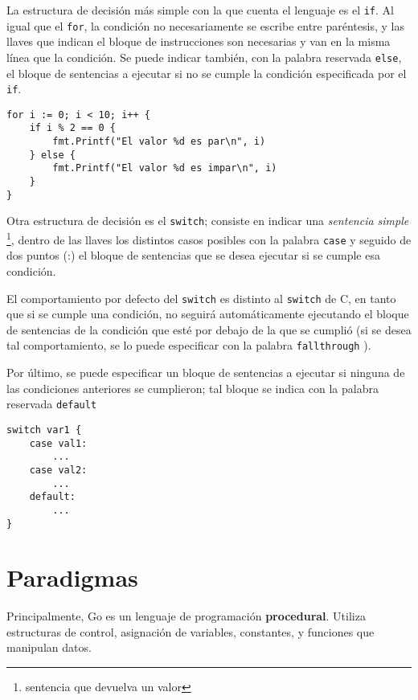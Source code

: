 La estructura de decisión más simple con la que cuenta el lenguaje es el \texttt{if}. Al igual que el \texttt{for}, la condición no necesariamente se escribe entre paréntesis, y las llaves que indican el bloque de instrucciones son necesarias y van en la misma línea que la condición. Se puede indicar también, con la palabra reservada \texttt{else}, el bloque de sentencias a ejecutar si no se cumple la condición especificada por el \texttt{if}.  

\vspace*{5mm}
\begin{lstlisting}[title={\centering Ejemplo de un \texttt{for}, un \texttt{if..else}, y operaciones aritméticas}]
for i := 0; i < 10; i++ {
    if i % 2 == 0 {
        fmt.Printf("El valor %d es par\n", i)
    } else {
        fmt.Printf("El valor %d es impar\n", i)
    }
}
\end{lstlisting}

Otra estructura de decisión es el \texttt{switch}; consiste en indicar una \emph{sentencia simple} \footnote{sentencia que devuelva un valor}, dentro de las llaves los distintos casos posibles con la palabra \texttt{case} y seguido de dos puntos (:) el bloque de sentencias que se desea ejecutar si se cumple esa condición. 

El comportamiento por defecto del \texttt{switch} es distinto al \texttt{switch} de C, en tanto que si se cumple una condición, no seguirá automáticamente ejecutando el bloque de sentencias de la condición que esté por debajo de la que se cumplió (si se desea tal comportamiento, se lo puede especificar con la palabra \texttt{fallthrough} \autocite{TheWayToGo:Origins}).

Por último, se puede especificar un bloque de sentencias a ejecutar si ninguna de las condiciones anteriores se cumplieron; tal bloque se indica con la palabra reservada \texttt{default} 

\begin{lstlisting}[title=Estructura de decisión múltiple \texttt{switch}]
switch var1 {
    case val1:
        ...
    case val2:
        ...
    default:
        ...
}
\end{lstlisting}


\section{Paradigmas}

Principalmente, Go es un lenguaje de programación \textbf{procedural}. Utiliza estructuras de control, asignación de variables, constantes, y funciones que manipulan datos.

